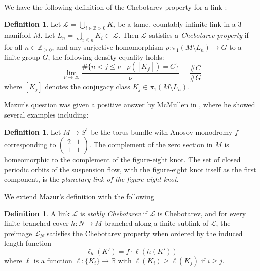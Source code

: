 \documentclass{amsart}
\theoremstyle{plain}
\theoremstyle{definition}
\newtheorem{Def}[theorem]{Definition}
\theoremstyle{plain}
\theoremstyle{plain}
\theoremstyle{plain}
\theoremstyle{remark}
\theoremstyle{remark}
\theoremstyle{plain}
\theoremstyle{definition}
\theoremstyle{plain}
\theoremstyle{plain}
\theoremstyle{plain}
\numberwithin{equation}{section}
\begin{document}
We have the following definition of the Chebotarev property for a link \cite{mazur}:

\begin{Def}\label{def:chebo}
Let $\mathcal{L} = \bigcup_{i \in \mathbb{Z} > 0}K_i$ be a tame, countably infinite link in a 3-manifold $M$. Let $L_n = \bigcup_{i \leq n}K_i \subset \mathcal L$. Then $\mathcal{L}$ satisfies a \emph{Chebotarev property} if for all $n \in \mathbb{Z}_{\geq 0}$, and any surjective homomorphism $\rho: \pi_1(M \setminus L_n) \to G$ to a finite group $G$, the following density equality holds:
\begin{equation}
    \lim_{\nu \to \infty}\frac{\#\{n < j \leq \nu \mid \rho([K_j]) = C\}}{\nu} = \frac{\#C}{\#G}
\end{equation}
where $[K_j]$ denotes the conjugacy class $K_j \in \pi_1(M \setminus L_n)$.
\end{Def}

Mazur's question was given a positive answer by McMullen in \cite{mcmullen2013knots}, where he showed several examples including:

\begin{Def}\cite{mcmullen2013knots}
Let $M \to S^1$ be the torus bundle with Anosov monodromy $f$ corresponding to $\begin{pmatrix} 2 & 1 \\ 1 & 1 \end{pmatrix}$. The complement of the zero section in $M$ is homeomorphic to the complement of the figure-eight knot. The set of closed periodic orbits of the suspension flow, with the figure-eight knot itself as the first component, is the \emph{planetary link of the figure-eight knot}. 
\end{Def}

We extend Mazur's definition with the following 

\begin{Def}\label{def:stably}
A link $\mathcal{L}$ is \emph{stably Chebotarev} if $\mathcal{L}$ is Chebotarev, and for every finite branched cover $h: N \to M$ branched along a finite sublink of $\mathcal{L}$, the preimage $\mathcal{L}_N$ satisfies the Chebotarev property when ordered by the induced length function
\begin{equation}
    \ell_h(K') = f \cdot \ell(h(K'))
\end{equation}
where $\ell$ is a function $\ell :\{K_i\}\rightarrow\mathbb{R}$ with $\ell(K_i)\geq \ell(K_j)$ if $i\geq j$. 
\end{Def}
\end{document}
